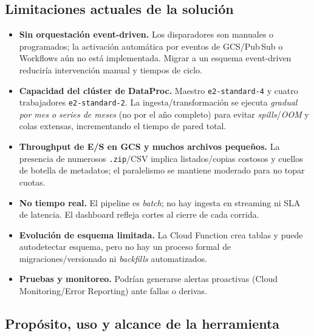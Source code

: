 \documentclass[10pt]{article}
\begin{document}
\subsection{Limitaciones actuales de la solución}
\label{subsec:limitaciones-solucion}

\begin{itemize}
  \item \textbf{Sin orquestación event-driven.} Los disparadores son manuales o programados; la activación automática por eventos de GCS/Pub\,\/Sub o Workflows aún no está implementada. Migrar a un esquema event-driven reduciría intervención manual y tiempos de ciclo.
  \item \textbf{Capacidad del clúster de DataProc.} Maestro \texttt{e2-standard-4} y cuatro trabajadores \texttt{e2-standard-2}. La ingesta/transformación se ejecuta \emph{gradual por mes o series de meses} (no por el año completo) para evitar \textit{spills}/\textit{OOM} y colas extensas, incrementando el tiempo de pared total.
  \item \textbf{Throughput de E/S en GCS y muchos archivos pequeños.} La presencia de numerosos \texttt{.zip}/CSV implica listados/copias costosos y cuellos de botella de metadatos; el paralelismo se mantiene moderado para no topar cuotas.
  \item \textbf{No tiempo real.} El pipeline es \textit{batch}; no hay ingesta en streaming ni SLA de latencia. El dashboard refleja cortes al cierre de cada corrida.
  \item \textbf{Evolución de esquema limitada.} La Cloud Function crea tablas y puede autodetectar esquema, pero no hay un proceso formal de migraciones/versionado ni \textit{backfills} automatizados.
  \item \textbf{Pruebas y monitoreo.} Podrían generarse alertas proactivas (Cloud Monitoring/Error Reporting) ante fallas o derivas.
\end{itemize}

\subsection{Propósito, uso y alcance de la herramienta} %
\end{document}
